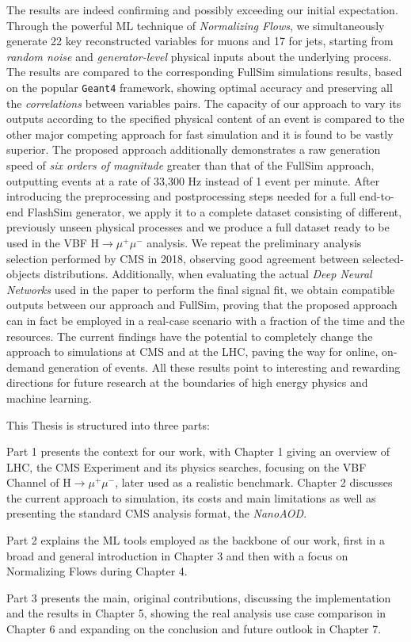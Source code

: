 The results are indeed confirming and possibly exceeding our initial expectation. Through the powerful ML technique of \emph{Normalizing Flows}, we simultaneously generate 22 key reconstructed variables for muons and 17 for jets, starting from \emph{random noise} and \emph{generator-level} physical inputs about the underlying process. The results are compared to the corresponding FullSim simulations results, based on the popular \texttt{Geant4} framework, showing optimal accuracy and preserving all the \emph{correlations} between variables pairs. 
The capacity of our approach to vary its outputs according to the specified physical content of an event is compared to the other major competing approach for fast simulation and it is found to be vastly superior. The proposed approach additionally demonstrates a raw generation speed of \emph{six orders of magnitude} greater than that of the FullSim approach, outputting events at a rate of 33,300 Hz instead of 1 event per minute. After introducing the preprocessing and postprocessing steps needed for a full end-to-end FlashSim generator, we apply it to a complete dataset consisting of different, previously unseen physical processes and we produce a full dataset ready to be used in the VBF H$\rightarrow\mu^+\mu^-$ analysis. We repeat the preliminary analysis selection performed by CMS in 2018, observing good agreement between selected-objects distributions. Additionally, when evaluating the actual \emph{Deep Neural Networks} used in the paper to perform the final signal fit, we obtain compatible outputs between our approach and FullSim, proving that the proposed approach can in fact be employed in a real-case scenario with a fraction of the time and the resources.
The current findings have the potential to completely change the approach to simulations at CMS and at the LHC, paving the way for online, on-demand generation of events. All these results point to interesting and rewarding directions for future research at the boundaries of high energy physics and machine learning.

This Thesis is structured into three parts:

Part 1 presents the context for our work, with Chapter 1 giving an overview of LHC, the CMS Experiment and its physics searches, focusing on the VBF Channel of H$\rightarrow\mu^+\mu^-$, later used as a realistic benchmark. Chapter 2 discusses the current approach to simulation, its costs and main limitations as well as presenting the standard CMS analysis format, the \emph{NanoAOD}.

Part 2 explains the ML tools employed as the backbone of our work, first in a broad and general introduction in Chapter 3 and then with a focus on Normalizing Flows during Chapter 4.

Part 3 presents the main, original contributions, discussing the implementation and the results in Chapter 5, showing the real analysis use case comparison in Chapter 6 and expanding on the conclusion and future outlook in Chapter 7. 
\endgroup

\vfill

